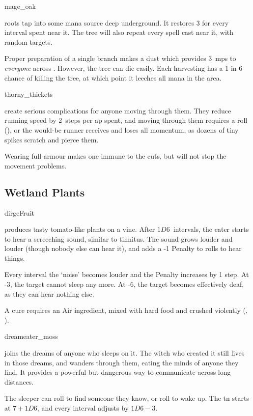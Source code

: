 \begin{multicols}{2}
%
  {mage_oak}%
  {roots tap into some mana source deep underground.
    It restores 3  for every \gls{interval} spent near it.
    The tree will also repeat every spell cast near it, with random targets.

    Proper preparation of a single branch makes a dust which provides 3~\glspl{mp} to \emph{everyone} across .
    However, the tree can die easily.
    Each harvesting has a 1 in 6 chance of killing the tree, at which point it leeches all mana in the \gls{area}.
  }%

%
  {thorny_thickets}%
  {create serious complications for anyone moving through them.
    They reduce running speed by 2~\glspl{step} per \gls{ap} spent, and moving through them requires a  roll (\tn[10]), or the would-be runner receives  and loses all momentum, as dozens of tiny spikes scratch and pierce them.

    Wearing full armour makes one immune to the cuts, but will not stop the movement problems.}%

\subsection{Wetland Plants}
\setcounter{encnum}{0}

%
  {dirgeFruit}%
  {produces tasty tomato-like plants on a vine.
    After $1D6$~\glspl{interval}, the eater starts to hear a screeching sound, similar to tinnitus.
    The sound grows louder and louder (though nobody else can hear it), and adds a -1 Penalty to rolls to hear things.

    Every \gls{interval} the `noise' becomes louder and the Penalty increases by 1 step.
    At -3, the target cannot sleep any more.
    At -6, the target becomes effectively deaf, as they can hear nothing else.

    A cure requires an Air \gls{ingredient}, mixed with hard food and crushed violently (, \tn[10]).}%


%
  {dreameater_moss}%
  {joins the dreams of anyone who sleeps on it.
    The \gls{witch} who created it still lives in those dreams, and wanders through them, eating the minds of anyone they find.
    It provides a powerful but dangerous way to communicate across long distances.

    The sleeper can roll  to find someone they know, or roll  to wake up.
    The \gls{tn} starts at $7 + 1D6$, and every \gls{interval} adjusts by $1D6 - 3$.

}
\end{multicols}
